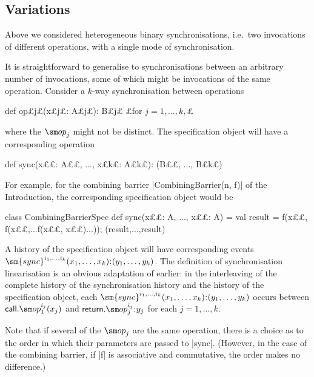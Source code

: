 \subsection{Variations}
\label{ssec:spec-variations}

Above we considered heterogeneous binary synchronisations, i.e.~two
invocations of different operations, with a single mode of synchronisation.

It is straightforward to generalise to synchronisations between an arbitrary
number of invocations, some of which might be invocations of the same
operation.  Consider a $k$-way synchronisation between operations
\begin{scala}
def op£\s j£(x£\s j£: A£\s j£): B£\s j£   £for $j = 1, \ldots, k,$£
\end{scala}
%
where the $\op_j$ might not be distinct.
The specification object will have a corresponding operation
%
\begin{scala} 
def sync(x££: A££, ..., x£\s k£: A£\s k£): (B££, ..., B£\s k£)
\end{scala}
%
For example, for the combining barrier |CombiningBarrier(n, f)| of the
Introduction, the corresponding specification object would be
\begin{scala}
class CombiningBarrierSpec{
  def sync(x££: A, ..., x££: A) = {
    val result = f(x££, f(x££,...f(x££, x££)...)); (result,...,result)
  }
}
\end{scala}

A history of the specification object will have corresponding events
$\sm{sync}^{i_1, \ldots, i_k}(x_1, \ldots, x_k)\:: (y_1, \ldots, y_k)$.
%
The definition of synchronisation linearisation is an obvious adaptation of
earlier: in the interleaving of the complete history of the synchronisation
history and the history of the specification object, each $\sm{sync}^{i_1,
  \ldots, i_k}(x_1, \ldots, x_k)\:: (y_1, \ldots, y_k)$ occurs between
$\call.\op_1^{i_j}(x_j)$ and $\return.\op_j^{i_j}\::y_j$ for each $j = 1,
\ldots, k$.  

Note that if several of the $\op_j$ are the same operation, there is a choice
as to the order in which their parameters are passed to |sync|.  (However, in
the case of the combining barrier, if |f| is associative and commutative, the
order makes no difference.)

